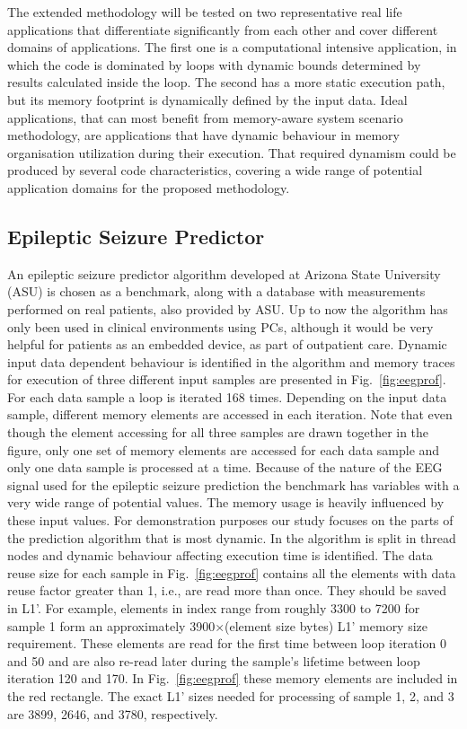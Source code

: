The extended methodology will be tested on two representative real life applications that differentiate significantly from each other and cover different domains of applications. The first one is a computational intensive application, in which the code is dominated by loops with dynamic bounds determined by results calculated inside the loop. The second has a more static execution path, but its memory footprint is dynamically defined by the input data. Ideal applications, that can most benefit from memory-aware system scenario methodology, are applications that have dynamic behaviour in memory organisation utilization during their execution. That required dynamism could be produced by several code characteristics, covering a wide range of potential application domains for the proposed methodology.

\subsection{Epileptic Seizure Predictor}

An epileptic seizure predictor algorithm developed at Arizona State University (ASU) \cite{Iasemidis2005} is chosen as a benchmark, along with a database with measurements performed on real patients, also provided by ASU. Up to now the algorithm has only been used in clinical environments using PCs, although it would be very helpful for patients as an embedded device, as part of outpatient care. Dynamic input data dependent behaviour is identified in the algorithm and memory traces for execution of three different input samples are presented in Fig.~\ref{fig:eegprof}. For each data sample a loop is iterated 168 times. Depending on the input data sample, different memory elements are accessed in each iteration. Note that even though the element accessing for all three samples are drawn together in the figure, only one set of memory elements are accessed for each data sample and only one data sample is processed at a time. Because of the nature of the EEG  signal used for the epileptic seizure prediction the benchmark has variables with a very wide range of potential values. The memory usage is heavily influenced by these input values. For demonstration purposes our study focuses on the parts of the prediction algorithm that is most dynamic. In \cite{Elena2010} the algorithm is split in thread nodes and dynamic behaviour affecting execution time is identified. The data reuse size for each sample in Fig.~\ref{fig:eegprof} contains all the elements with data reuse factor greater than 1, i.e., are read more than once. They should be saved in L1'. For example, elements in index range from roughly 3300 to 7200 for sample 1 form an approximately 3900$ \times $(element size bytes) L1' memory size requirement. These elements are read for the first time between loop iteration 0 and 50 and are also re-read later during the sample's lifetime between loop iteration 120 and 170. In Fig.~\ref{fig:eegprof} these memory elements are included in the red rectangle. The exact L1' sizes needed for processing of sample 1, 2, and 3 are 3899, 2646, and 3780, respectively.


